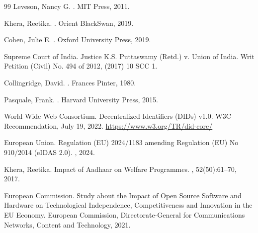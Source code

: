 \documentclass{article}
\begin{document}
\begin{thebibliography}{99}
Leveson, Nancy G.
.
\newblock MIT Press, 2011.

Khera, Reetika.
.
\newblock Orient BlackSwan, 2019.

Cohen, Julie E.
.
\newblock Oxford University Press, 2019.

Supreme Court of India.
\newblock Justice K.S. Puttaswamy (Retd.) v. Union of India.
\newblock Writ Petition (Civil) No. 494 of 2012, (2017) 10 SCC 1.

Collingridge, David.
.
\newblock Frances Pinter, 1980.

Pasquale, Frank.
.
\newblock Harvard University Press, 2015.

World Wide Web Consortium.
\newblock Decentralized Identifiers (DIDs) v1.0.
\newblock W3C Recommendation, July 19, 2022.
\newblock \url{https://www.w3.org/TR/did-core/}

European Union.
\newblock Regulation (EU) 2024/1183 amending Regulation (EU) No 910/2014 (eIDAS 2.0).
, 2024.

Khera, Reetika.
\newblock Impact of Aadhaar on Welfare Programmes.
, 52(50):61--70, 2017.

European Commission.
\newblock Study about the Impact of Open Source Software and Hardware on Technological Independence, Competitiveness and Innovation in the EU Economy.
\newblock European Commission, Directorate-General for Communications Networks, Content and Technology, 2021.

\end{thebibliography}
\end{document}
